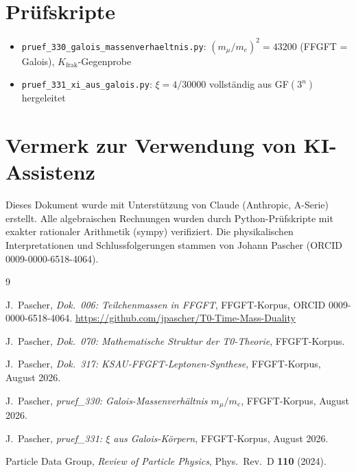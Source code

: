 \section*{Prüfskripte}

\begin{itemize}
  \item \texttt{pruef\_330\_galois\_massenverhaeltnis.py}:
    $(m_\mu/m_e)^2 = 43200$ (FFGFT = Galois), $K_\text{frak}$-Gegenprobe
  \item \texttt{pruef\_331\_xi\_aus\_galois.py}:
    $\xi = 4/30000$ vollständig aus GF$(3^n)$ hergeleitet
\end{itemize}

\section*{Vermerk zur Verwendung von KI-Assistenz}

Dieses Dokument wurde mit Unterstützung von Claude (Anthropic, A-Serie)
erstellt. Alle algebraischen Rechnungen wurden durch Python-Prüfskripte
mit exakter rationaler Arithmetik (sympy) verifiziert.
Die physikalischen Interpretationen und Schlussfolgerungen
stammen von Johann Pascher (ORCID 0009-0000-6518-4064).

\begin{thebibliography}{9}

J.~Pascher,
\textit{Dok.~006: Teilchenmassen in FFGFT},
FFGFT-Korpus, ORCID 0009-0000-6518-4064.
\url{https://github.com/jpascher/T0-Time-Mass-Duality}

J.~Pascher,
\textit{Dok.~070: Mathematische Struktur der T0-Theorie},
FFGFT-Korpus.

J.~Pascher,
\textit{Dok.~317: KSAU-FFGFT-Leptonen-Synthese},
FFGFT-Korpus, August 2026.

J.~Pascher,
\textit{pruef\_330: Galois-Massenverhältnis $m_\mu/m_e$},
FFGFT-Korpus, August 2026.

J.~Pascher,
\textit{pruef\_331: $\xi$ aus Galois-Körpern},
FFGFT-Korpus, August 2026.

Particle Data Group,
\textit{Review of Particle Physics},
Phys.\ Rev.\ D \textbf{110} (2024).

\end{thebibliography}
